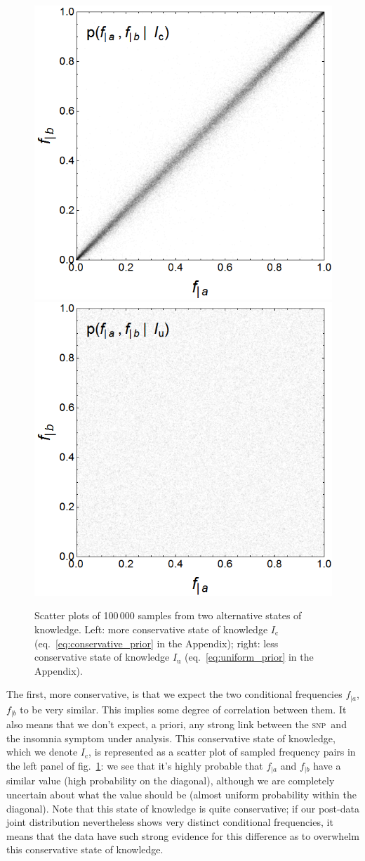 \documentclass[\ifafour a4paper,12pt,\else a5paper,10pt,\fi%
onecolumn,oneside,article,%
british%
]{memoir}
\theoremstyle{remark}
\theoremstyle{innote}
\renewcommand*{\|}[1][]{\nonscript\,#1\vert\nonscript\;\mathopen{}}
\newcommand*{\eqn}{eq.}%
\newcommand*{\fig}{fig.}%
\newcommand*{\snp}{\textsc{snp}}
\newcommand*{\yI}{I}
\newcommand*{\yIu}{\yI_\text{u}}
\newcommand*{\yIc}{\yI_\text{c}}
\newcommand*{\ya}{a}
\newcommand*{\yb}{b}
\begin{document}
\begin{figure}[t!]%
 \centering\includegraphics[width=0.49\linewidth]{conserv_prior_list.png}%
 \includegraphics[width=0.49\linewidth]{unif_prior_list.png}
 \caption{Scatter plots of 100\,000 samples from two alternative states of
   knowledge. Left: more conservative state of knowledge $\yIc$
   (\eqn~\ref{eq:conservative_prior} in the Appendix); right: less
   conservative state of knowledge $\yIu$ (\eqn~\ref{eq:uniform_prior} in
   the Appendix).}\label{fig:initial_beliefs}
\end{figure}%
The first, more conservative, is that we expect the two conditional
frequencies $f_{|\ya}$, $f_{|\yb}$ to be very similar. This implies some
degree of correlation between them. It also means that we don't expect, a
priori, any strong link between the \snp\ and the insomnia symptom under
analysis. This conservative state of knowledge, which we denote $\yIc$, is
represented as a scatter plot of sampled frequency pairs in the left panel
of \fig~\ref{fig:initial_beliefs}: we see that it's highly probable that
$f_{|\ya}$ and $f_{|\yb}$ have a similar value (high probability on the
diagonal), although we are completely uncertain about what the value should
be (almost uniform probability within the diagonal). Note that this state
of knowledge is quite conservative; if our post-data joint distribution
nevertheless shows very distinct conditional frequencies, it means that the
data have such strong evidence for this difference as to overwhelm this
conservative state of knowledge.
\end{document}
